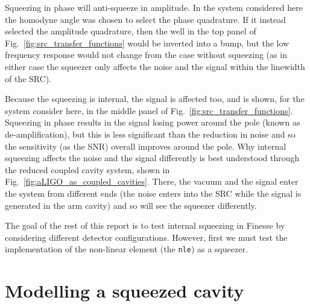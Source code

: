 \documentclass[aps,pra,superscriptaddress,reprint,nofootinbib]{revtex4-1}
\newcommand{\code}[1]{\texttt{#1}}
\begin{document}
Squeezing in phase will anti-squeeze in amplitude. In the system considered here the homodyne angle was chosen to select the phase quadrature. If it instead selected the amplitude quadrature, then the well in the top panel of Fig.~\ref{fig:src_transfer_functions} would be inverted into a bump, but the low frequency response would not change from the case without squeezing (as in either case the squeezer only affects the noise and the signal within the linewidth of the SRC).

Because the squeezing is internal, the signal is affected too, and is shown, for the system consider here, in the middle panel of Fig.~\ref{fig:src_transfer_functions}. Squeezing in phase results in the signal losing power around the pole (known as de-amplification), but this is less significant than the reduction in noise and so the sensitivity (as the SNR) overall improves around the pole.
Why internal squeezing affects the noise and the signal differently is best understood through the reduced coupled cavity system, shown in Fig.~\ref{fig:aLIGO_as_coupled_cavities}. There, the vacuum and the signal enter the system from different ends (the noise enters into the SRC while the signal is generated in the arm cavity) and so will see the squeezer differently.


The goal of the rest of this report is to test internal squeezing in Finesse by considering different detector configurations. However, first we must test the implementation of the non-linear element (the \code{nle}) as a squeezer.


\section{Modelling a squeezed cavity} %
\label{sec:sqzcavity}
\end{document}
